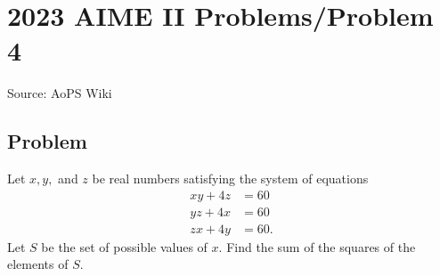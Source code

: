 \documentclass[12pt]{article}
\begin{document}
\section*{{2023 AIME II Problems/Problem 4}}
Source: AoPS Wiki

\subsection*{Problem}
Let $x,y,$ and $z$ be real numbers satisfying the system of equations \begin{align*} xy + 4z &= 60 \\ yz + 4x &= 60 \\ zx + 4y &= 60. \end{align*} Let $S$ be the set of possible values of $x.$ Find the sum of the squares of the elements of $S.$
\end{document}
